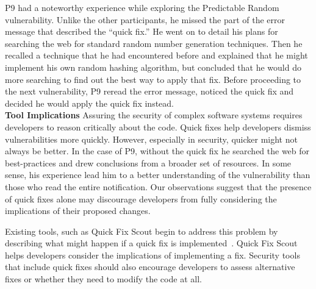 \documentclass[conference]{IEEEtran}
\begin{document}
P9 had a noteworthy experience while exploring the Predictable Random vulnerability. Unlike the other participants, he missed the part of the error message that described the ``quick fix.'' 
He went on to detail his plans for searching the web for standard random number generation techniques. 
Then he recalled a technique that he had encountered before and explained that he might implement his own random hashing algorithm, but concluded that he would do more searching to find out the best way to apply that fix.
Before proceeding to the next vulnerability, P9 reread the error message, noticed the quick fix and decided he would apply the quick fix instead.
\\


\noindent\textbf{Tool Implications}
Assuring the security of complex software systems requires developers to reason critically about the code. 
Quick fixes help developers dismiss vulnerabilities more quickly.
However, especially in security, quicker might not always be better. 
In the case of P9, without the quick fix he searched the web for best-practices and drew conclusions from a broader set of resources.
In some sense, his experience lead him to a better understanding of the vulnerability than those who read the entire notification.
Our observations suggest that the presence of quick fixes alone may discourage developers from fully considering the implications of their proposed changes.

Existing tools, such as Quick Fix Scout begin to address this problem by describing what might happen if a quick fix is implemented~\cite{mucslu2012speculative}. 
Quick Fix Scout helps developers consider the implications of implementing a fix.
Security tools that include quick fixes should also encourage developers to assess alternative fixes or whether they need to modify the code at all.
\end{document}
